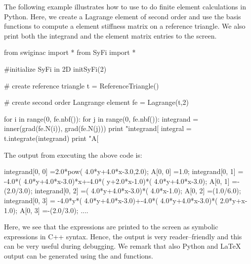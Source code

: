 The following example illustrates how to use \syfi{} to do finite element
calculations in Python.  Here, we create a Lagrange element of second
order and use the basis functions to compute a element stiffness matrix
on a reference triangle. We also print both the integrand and the element
matrix entries to the screen.\vspace*{-6pt}
\begin{python}
from swiginac import *
from SyFi import *

#initialize SyFi in 2D
initSyFi(2)

# create reference triangle
t = ReferenceTriangle()

# create second order Langrange element
fe = Lagrange(t,2)

for i in range(0, fe.nbf()):
    for j in range(0, fe.nbf()):
        integrand = inner(grad(fe.N(i)), grad(fe.N(j)))
        print "integrand[%
        integral = t.integrate(integrand)
        print "A[%
\end{python}
The output from executing the above code is:\vspace*{-6pt}
\begin{c++}
integrand[0, 0]  =2.0*pow( 4.0*y+4.0*x-3.0,2.0);
A[0, 0]          =1.0;
integrand[0, 1]  = -4.0*( 4.0*y+4.0*x-3.0)*x+-4.0*( y+2.0*x-1.0)*( 4.0*y+4.0*x-3.0);
A[0, 1]          =-(2.0/3.0);
integrand[0, 2]  =( 4.0*y+4.0*x-3.0)*( 4.0*x-1.0);
A[0, 2]          =(1.0/6.0);
integrand[0, 3]  = -4.0*y*( 4.0*y+4.0*x-3.0)+-4.0*( 4.0*y+4.0*x-3.0)*( 2.0*y+x-1.0);
A[0, 3]          =-(2.0/3.0);
....
\end{c++}
Here, we see that the expressions are printed to the screen as symbolic
expressions in C++ syntax. Hence, the output is very reader--friendly
and this can be very useful during debugging.  We remark that also
Python and LaTeX output can be generated using the 
and  functions.

